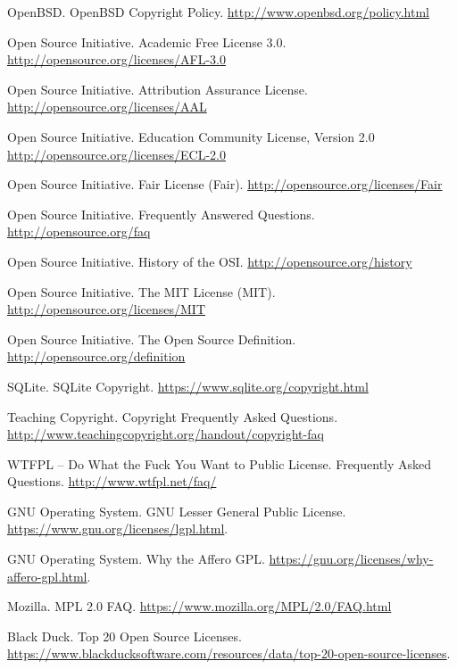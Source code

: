 \documentclass[12pt,letterpaper]{article}
\begin{document}
\begin{thebibliography}{20}
 OpenBSD. OpenBSD Copyright Policy. \url{http://www.openbsd.org/policy.html}

 Open Source Initiative. Academic Free License 3.0. \url{http://opensource.org/licenses/AFL-3.0}

 Open Source Initiative. Attribution Assurance License. \url{http://opensource.org/licenses/AAL}

 Open Source Initiative. Education Community License, Version 2.0 \url{http://opensource.org/licenses/ECL-2.0}

 Open Source Initiative. Fair License (Fair). \url{http://opensource.org/licenses/Fair}

 Open Source Initiative. Frequently Answered Questions. \url{http://opensource.org/faq}

 Open Source Initiative. History of the OSI. \url{http://opensource.org/history}

 Open Source Initiative. The MIT License (MIT). \url{http://opensource.org/licenses/MIT}

 Open Source Initiative. The Open Source Definition. \url{http://opensource.org/definition}

 SQLite. SQLite Copyright. \url{https://www.sqlite.org/copyright.html}

 Teaching Copyright. Copyright Frequently Asked Questions. \url{http://www.teachingcopyright.org/handout/copyright-faq}

 WTFPL – Do What the Fuck You Want to Public License. Frequently Asked Questions. \url{http://www.wtfpl.net/faq/}


 GNU Operating System. GNU Lesser General Public License. \url{https://www.gnu.org/licenses/lgpl.html}.

 GNU Operating System. Why the Affero GPL. \url{https://gnu.org/licenses/why-affero-gpl.html}.

 Mozilla. MPL 2.0 FAQ. \url{https://www.mozilla.org/MPL/2.0/FAQ.html}

 Black Duck. Top 20 Open Source Licenses. \url{https://www.blackducksoftware.com/resources/data/top-20-open-source-licenses}.

\end{thebibliography}
\end{document}
